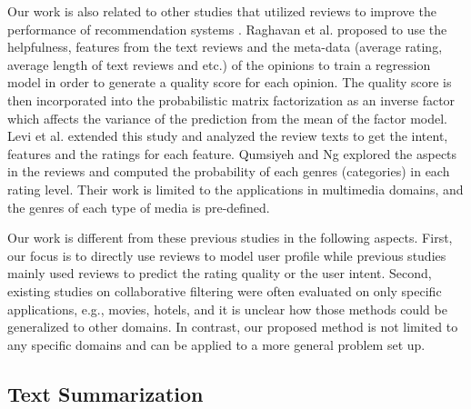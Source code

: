 Our work is also related to other studies that utilized reviews to improve 
the performance of recommendation systems \cite{Qumsiyeh:2012:PRM:2348283.2348349,SanPedro:2012:LUC:2187836.2187896,Raghavan:2012:RQA:2365952.2365978,hariricontext,Levi:2012:FNH:2365952.2365977}.
Raghavan et al. \cite{Raghavan:2012:RQA:2365952.2365978} proposed to 
use the helpfulness, features from the text reviews and 
the meta-data (average rating, average length of text reviews and etc.) 
of the opinions to train a regression model in order to generate a 
quality score for each opinion. The quality score is then 
incorporated into the probabilistic matrix factorization as an 
inverse factor which affects the variance of the prediction from the 
mean of the factor model.
Levi et al. \cite{Levi:2012:FNH:2365952.2365977} extended 
this study and analyzed the review texts to get the intent, 
features and the ratings for each feature. 
Qumsiyeh and Ng \cite{Qumsiyeh:2012:PRM:2348283.2348349} explored the 
aspects in the reviews and computed the probability of each genres 
(categories) in each rating level. Their work is limited to the 
applications in multimedia domains, and the genres of each type of 
media is pre-defined. 

Our work is different from these previous studies in the following 
aspects. First, our focus is to directly use reviews to model user 
profile while previous studies mainly used reviews to predict the 
rating quality or the user intent. Second, existing studies on 
collaborative filtering were often evaluated on only specific applications, 
e.g., movies, hotels, and it is unclear how those methods could 
be generalized to other domains. In contrast, our proposed method 
is not limited to any specific domains and can be applied to 
a more general problem set up.  

\subsection{Text Summarization} 

